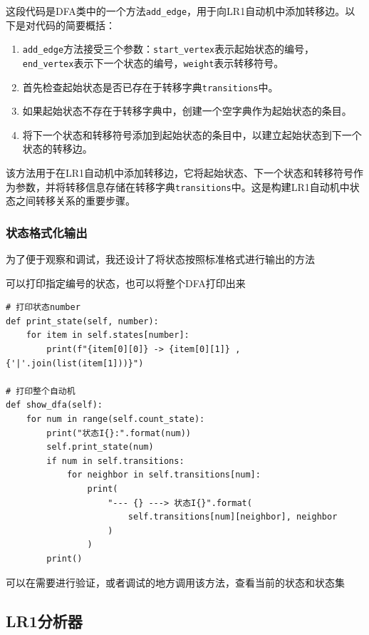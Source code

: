 \documentclass[lang=cn,11pt,a4paper]{elegantpaper}
\begin{document}
这段代码是DFA类中的一个方法\lstinline{add_edge}，用于向LR1自动机中添加转移边。以下是对代码的简要概括：

\begin{enumerate}
    \item \lstinline{add_edge}方法接受三个参数：\lstinline{start_vertex}表示起始状态的编号，\lstinline{end_vertex}表示下一个状态的编号，\lstinline{weight}表示转移符号。
    \item 首先检查起始状态是否已存在于转移字典\lstinline{transitions}中。
    \item 如果起始状态不存在于转移字典中，创建一个空字典作为起始状态的条目。
    \item 将下一个状态和转移符号添加到起始状态的条目中，以建立起始状态到下一个状态的转移边。
\end{enumerate}

该方法用于在LR1自动机中添加转移边，它将起始状态、下一个状态和转移符号作为参数，并将转移信息存储在转移字典\lstinline{transitions}中。这是构建LR1自动机中状态之间转移关系的重要步骤。

\subsubsection{状态格式化输出}

为了便于观察和调试，我还设计了将状态按照标准格式进行输出的方法

可以打印指定编号的状态，也可以将整个DFA打印出来

\begin{lstlisting}
# 打印状态number
def print_state(self, number):
    for item in self.states[number]:
        print(f"{item[0][0]} -> {item[0][1]} , {'|'.join(list(item[1]))}")

# 打印整个自动机
def show_dfa(self):
    for num in range(self.count_state):
        print("状态I{}:".format(num))
        self.print_state(num)
        if num in self.transitions:
            for neighbor in self.transitions[num]:
                print(
                    "--- {} ---> 状态I{}".format(
                        self.transitions[num][neighbor], neighbor
                    )
                )
        print()
\end{lstlisting}

可以在需要进行验证，或者调试的地方调用该方法，查看当前的状态和状态集

\subsection{LR1分析器}
\end{document}
